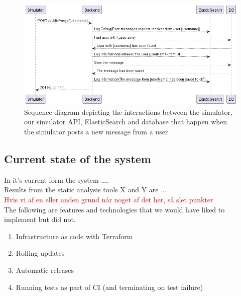 \begin{figure}[H]
 \centering
 \includegraphics[width = .9 \textwidth]{Images/sim_backend_elastic_sequence.png}
 \caption{Sequence diagram depicting the interactions between the simulator, our simulator API, ElasticSearch and database that happen when the simulator posts a new message from a user}
 \label{fig:SequenceDiagramElasticBackendSim}
\end{figure}


\subsection{Current state of the system}

In it's current form the system .... \\ 

Results from the static analysis tools X and Y are ... \\ 


\textcolor{red}{Hvis vi af en eller anden grund når noget af det her, så slet punkter} \\
The following are features and technologies that we would have liked to implement but did not.

\begin{enumerate}
    \item Infrastructure as code with Terraform
    \item Rolling updates 
    \item Automatic releases
    \item Running tests as part of CI (and terminating on test failure)
\end{enumerate}



